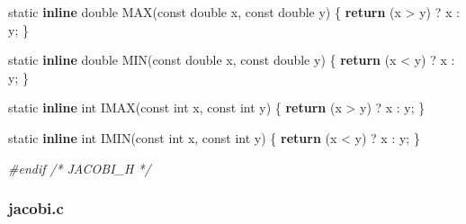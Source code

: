\documentclass[12pt,]{article}
\newenvironment{Shaded}{\begin{snugshade}}{\end{snugshade}}
\newcommand{\KeywordTok}[1]{\textcolor[rgb]{0.13,0.29,0.53}{\textbf{#1}}}
\newcommand{\DataTypeTok}[1]{\textcolor[rgb]{0.13,0.29,0.53}{#1}}
\newcommand{\CommentTok}[1]{\textcolor[rgb]{0.56,0.35,0.01}{\textit{#1}}}
\newcommand{\ControlFlowTok}[1]{\textcolor[rgb]{0.13,0.29,0.53}{\textbf{#1}}}
\newcommand{\PreprocessorTok}[1]{\textcolor[rgb]{0.56,0.35,0.01}{\textit{#1}}}
\newcommand{\NormalTok}[1]{#1}
\begin{document}
\begin{Shaded}
\begin{Highlighting}[]
\DataTypeTok{static} \KeywordTok{inline} \DataTypeTok{double}\NormalTok{ MAX(}\DataTypeTok{const} \DataTypeTok{double}\NormalTok{ x, }\DataTypeTok{const} \DataTypeTok{double}\NormalTok{ y) \{}
    \ControlFlowTok{return}\NormalTok{ (x > y) ? x : y;}
\NormalTok{\}}

\DataTypeTok{static} \KeywordTok{inline} \DataTypeTok{double}\NormalTok{ MIN(}\DataTypeTok{const} \DataTypeTok{double}\NormalTok{ x, }\DataTypeTok{const} \DataTypeTok{double}\NormalTok{ y) \{}
    \ControlFlowTok{return}\NormalTok{ (x < y) ? x : y;}
\NormalTok{\}}

\DataTypeTok{static} \KeywordTok{inline} \DataTypeTok{int}\NormalTok{ IMAX(}\DataTypeTok{const} \DataTypeTok{int}\NormalTok{ x, }\DataTypeTok{const} \DataTypeTok{int}\NormalTok{ y) \{ }\ControlFlowTok{return}\NormalTok{ (x > y) ? x : y; \}}

\DataTypeTok{static} \KeywordTok{inline} \DataTypeTok{int}\NormalTok{ IMIN(}\DataTypeTok{const} \DataTypeTok{int}\NormalTok{ x, }\DataTypeTok{const} \DataTypeTok{int}\NormalTok{ y) \{ }\ControlFlowTok{return}\NormalTok{ (x < y) ? x : y; \}}

\PreprocessorTok{#endif }\CommentTok{/* JACOBI_H */}
\end{Highlighting}
\end{Shaded}

\subsubsection{jacobi.c}\label{jacobi.c}
\end{document}
